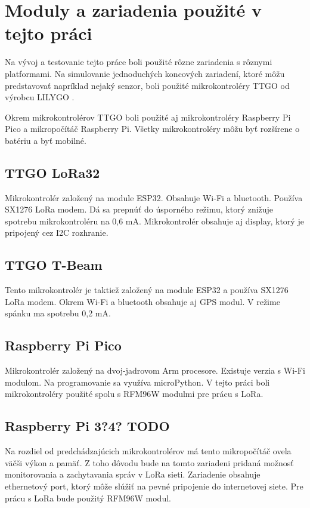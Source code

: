 \documentclass[slovak,master]{diploma}
\begin{document}
\section{Moduly a zariadenia použité v tejto práci}
Na vývoj a testovanie tejto práce boli použité rôzne zariadenia s rôznymi platformami. Na simulovanie jednoduchých koncových zariadení, 
ktoré môžu predstavovať napríklad nejaký senzor, boli použité mikrokontroléry TTGO od výrobcu LILYGO \cite{lilygo}.

Okrem mikrokontrolérov TTGO boli použité aj mikrokontroléry Raspberry Pi Pico a mikropočítáč Raspberry Pi.
Všetky mikrokontroléry môžu byť rozšírene o batériu a byť mobilné.

\subsection{TTGO LoRa32}
Mikrokontrolér založený na module ESP32. Obsahuje Wi-Fi a bluetooth. Používa SX1276 LoRa modem.
Dá sa prepnúť do úsporného režimu, ktorý znižuje spotrebu mikrokontroléru na 0,6 mA.
Mikrokontrolér obsahuje aj display, ktorý je pripojený cez I2C rozhranie.

\subsection{TTGO T-Beam}
Tento mikrokontrolér je taktiež založený na module ESP32 a používa SX1276 LoRa modem. Okrem Wi-Fi a bluetooth obsahuje aj GPS modul.
V režime spánku ma spotrebu 0,2 mA.

\subsection{Raspberry Pi Pico}
Mikrokontrolér založený na dvoj-jadrovom Arm procesore. Existuje verzia s Wi-Fi modulom. Na programovanie sa využíva microPython. %
V tejto práci boli mikrokontroléry použité spolu s RFM96W modulmi pre prácu s LoRa.

\subsection{Raspberry Pi 3?4? TODO}
Na rozdiel od predchádzajúcich mikrokontrolérov má tento mikropočítáč ovela väčši výkon a pamäť. Z toho dôvodu bude na tomto zariadeni pridaná 
možnosť monitorovania a zachytavania správ v LoRa sieti. Zariadenie obsahuje ethernetový port, ktorý môže slúžiť na pevné pripojenie do internetovej siete.
Pre prácu s LoRa bude použitý RFM96W modul.
\end{document}
